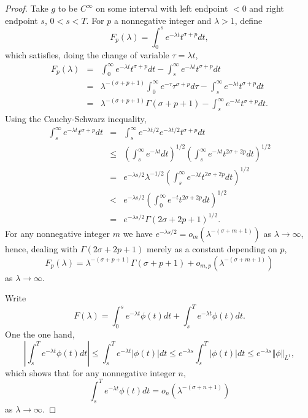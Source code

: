 \documentclass{article}
\newcommand{\norm}[1]{\left\Vert #1 \right\Vert}
\theoremstyle{definition}
\begin{document}
\begin{proof}
Take $g$ to be $C^\infty$ on some interval with left endpoint $<0$ and right endpoint $s$, $0<s<T$. 
For $p$ a nonnegative integer and $\lambda>1$, define
\[
F_p(\lambda)=\int_0^s e^{-\lambda t} t^{\sigma+p} dt,
\]
which satisfies, doing the change of variable $\tau=\lambda t$,
\begin{eqnarray*}
F_p(\lambda)&=&\int_0^\infty e^{-\lambda t} t^{\sigma+p} dt - \int_s^\infty e^{-\lambda t} t^{\sigma+p} dt\\
&=&\lambda^{-(\sigma+p+1)} \int_0^\infty e^{-\tau} \tau^{\sigma+p} d\tau
-\int_s^\infty e^{-\lambda t} t^{\sigma+p} dt\\
&=&\lambda^{-(\sigma+p+1)}  \Gamma(\sigma+p+1) -\int_s^\infty e^{-\lambda t}  t^{\sigma+p} dt.
\end{eqnarray*}
Using the Cauchy-Schwarz inequality,
\begin{eqnarray*}
\int_s^\infty e^{-\lambda t}  t^{\sigma+p} dt&=&\int_s^\infty e^{-\lambda t/2}   e^{-\lambda t/2} t^{\sigma+p} dt\\
&\leq&\left(\int_s^\infty e^{-\lambda t}  dt\right)^{1/2} \left( \int_s^\infty e^{-\lambda t} t^{2\sigma+2p} dt\right)^{1/2}\\
&=&e^{-\lambda s/2} \lambda^{-1/2}  \left( \int_s^\infty e^{-\lambda t} t^{2\sigma+2p} dt\right)^{1/2}\\
&<&e^{-\lambda s/2}  \left( \int_0^\infty e^{- t} t^{2\sigma+2p} dt\right)^{1/2}\\
&=&e^{-\lambda s/2}  \Gamma(2\sigma+2p+1)^{1/2}.
\end{eqnarray*}
For any nonnegative integer $m$ we have $e^{-\lambda s/2} = o_m(\lambda^{-(\sigma+m+1)})$ as $\lambda \to \infty$, hence, dealing with
$\Gamma(2\sigma+2p+1)$ merely as a constant depending on $p$,
\begin{equation}
F_p(\lambda) = \lambda^{-(\sigma+p+1)}  \Gamma(\sigma+p+1) + o_{m,p}(\lambda^{-(\sigma+m+1)})
\label{Fpinequality}
\end{equation}
as $\lambda \to \infty$.


Write
\[
F(\lambda) = \int_0^s e^{-\lambda t} \phi(t) dt + \int_s^T e^{-\lambda t} \phi(t) dt.
\]
One the one hand,
\[
\left|  \int_s^T e^{-\lambda t} \phi(t) dt \right| \leq \int_s^T e^{-\lambda t} |\phi(t)| dt
\leq e^{-\lambda s} \int_s^T |\phi(t)| dt
\leq e^{-\lambda s} \norm{\phi}_{L^1},
\]
which shows that
for any nonnegative integer $n$,
\[
 \int_s^T e^{-\lambda t} \phi(t) dt = o_n(\lambda^{-(\sigma+n+1)})
\]
as $\lambda \to \infty$.


\end{proof}
\end{document}
